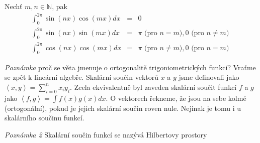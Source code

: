 \begin{vetal}
Nechť $m, n \in \mathbb{N}$, pak
\begin{eqnarray}
\int_{0}^{2 \pi} \sin (nx) \cos (mx) dx & = & 0 \nonumber\\
\int_{0}^{2 \pi} \sin (nx) \sin (mx) dx & = & \pi \textrm{ (pro $n=m$)}, 0 \textrm{ (pro $n \neq m$) } \nonumber\\
\int_{0}^{2 \pi} \cos (nx) \cos (mx) dx & = & \pi \textrm{ (pro $n \neq m$)}, 0 \textrm{ (pro $n=m$)} \nonumber
\end{eqnarray}
\end{vetal}

\emph{Poznámka} proč se věta jmenuje o ortogonalitě trigoniometrických funkcí? Vraťme se zpět k lineární algebře. Skalární součin vektorů $x$ a $y$ jsme definovali jako $\left\langle x,y \right\rangle = \sum_{i=0}^{n} x_i y_i$. Zcela ekvivalentně byl zaveden skalární součit funkcí $f$ a $g$ jako $\left\langle f, g \right\rangle = \int f(x) g(x) dx$. O vektorech řekneme, že jsou na sebe kolmé (ortogonální), pokud je jejich skalární součin roven nule. Nejinak je tomu i u skalárního součinu funkcí. 

\emph{Poznámka 2} Skalární součin funkcí se nazývá Hilbertovy prostory

